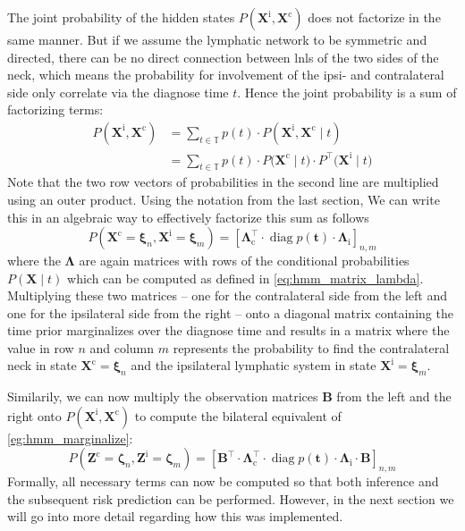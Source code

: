 \documentclass[\relativeRoot/main.tex]{subfiles}
\begin{document}
The joint probability of the hidden states $P \left( \mathbf{X}^\text{i}, \mathbf{X}^\text{c} \right)$ does not factorize in the same manner. But if we assume the lymphatic network to be symmetric and directed, there can be no direct connection between \glspl{lnl} of the two sides of the neck, which means the probability for involvement of the ipsi- and contralateral side only correlate via the diagnose time $t$. Hence the joint probability is a sum of factorizing terms:
%
\begin{equation} \label{eq:bilateral:expand:dissect}
    \begin{aligned}
        P \left( \mathbf{X}^\text{i}, \mathbf{X}^\text{c} \right) &= \sum_{t \in \mathbb{T}}{ p(t) \cdot P \left( \mathbf{X}^\text{i}, \mathbf{X}^\text{c} \mid t \right)} \\
        &= \sum_{t \in \mathbb{T}}{ p(t) \cdot P \big( \mathbf{X}^\text{c} \mid t \big) \cdot P^\top \big( \mathbf{X}^\text{i} \mid t \big)}
    \end{aligned}
\end{equation}
%
Note that the two row vectors of probabilities in the second line are multiplied using an outer product. Using the notation from the last section, We can write this in an algebraic way to effectively factorize this sum as follows
%
\begin{equation} \label{eq:bilateral:expand:algebra}
    P \left( \mathbf{X}^\text{c} = \boldsymbol{\xi}_n, \mathbf{X}^\text{i} = \boldsymbol{\xi}_m \right) = \left[ \boldsymbol{\Lambda}_\text{c}^\top \cdot \operatorname{diag}{p(\mathbf{t})} \cdot \boldsymbol{\Lambda}_\text{i} \right]_{n,m}
\end{equation}
%
where the $\boldsymbol{\Lambda}$ are again matrices with rows of the conditional probabilities $P \left( \mathbf{X} \mid t \right)$ which can be computed as defined in \cref{eq:hmm_matrix_lambda}. Multiplying these two matrices -- one for the contralateral side from the left and one for the ipsilateral side from the right -- onto a diagonal matrix containing the time prior marginalizes over the diagnose time and results in a matrix where the value in row $n$ and column $m$ represents the probability to find the contralateral neck in state $\mathbf{X}^\text{c} = \boldsymbol{\xi}_n$ and the ipsilateral lymphatic system in state $\mathbf{X}^\text{i} = \boldsymbol{\xi}_m$.

Similarily, we can now multiply the observation matrices $\mathbf{B}$ from the left and the right onto $P \left( \mathbf{X}^\text{i}, \mathbf{X}^\text{c} \right)$ to compute the bilateral equivalent of \cref{eg:hmm_marginalize}:
%
\begin{equation} \label{eq:bilateral:expand:observation}
    P \left( \mathbf{Z}^\text{c} = \boldsymbol{\zeta}_n, \mathbf{Z}^\text{i} = \boldsymbol{\zeta}_m \right) = \left[ \mathbf{B}^\top \cdot \boldsymbol{\Lambda}_\text{c}^\top \cdot \operatorname{diag}{p(\mathbf{t})} \cdot \boldsymbol{\Lambda}_\text{i} \cdot \mathbf{B} \right]_{n,m}
\end{equation}
%
Formally, all necessary terms can now be computed so that both inference and the subsequent risk prediction can be performed. However, in the next section we will go into more detail regarding how this was implemented.
\end{document}
